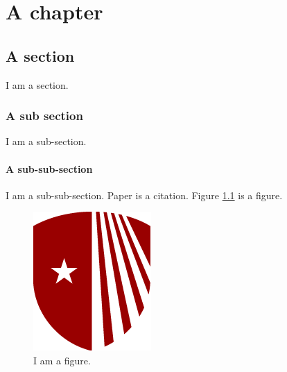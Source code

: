 \chapter{A chapter}

\section{A section}

I am a section.

\subsection{A sub section}

I am a sub-section.

\subsubsection{A sub-sub-section}

I am a sub-sub-section. Paper \cite{wang2001paper} is a citation. Figure \ref{fig: my figure} is a figure.

\begin{figure}[h]
    \centering
    \includegraphics[scale=0.70]{Figures/stony-brook-university-logo.png}
    \caption{I am a figure.} 
    \label{fig: my figure}
\end{figure}

